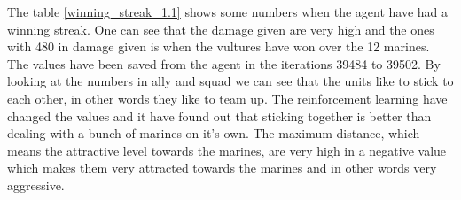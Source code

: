 The table \ref{winning_streak_1.1} shows some numbers when the agent have had a winning streak. One can see that the damage given are very high and the ones with 480 in damage given is when the vultures have won over the 12 marines. The values have been saved from the agent in the iterations 39484 to 39502. By looking at the numbers in ally and squad we can see that the units like to stick to each other, in other words they like to team up. The reinforcement learning have changed the values and it have found out that sticking together is better than dealing with a bunch of marines on it's own. The maximum distance, which means the attractive level towards the marines, are very high in a negative value which makes them very attracted towards the marines and in other words very aggressive. 







